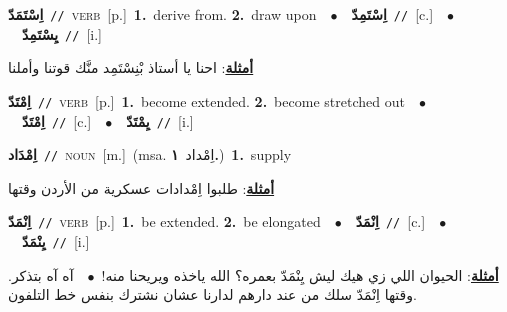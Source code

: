 \documentclass[10pt,a4paper,twoside]{article} %
\begin{document}
\begin{multicols}{2}
{\setlength\topsep{0pt}\textbf{\foreignlanguage{arabic}{اِسْتَمَدّ}}\ {\color{gray}\texttt{//}\color{black}}\ \textsc{verb}\ [p.]\ \textbf{1.}~derive from.  \textbf{2.}~draw upon\ \ $\bullet$\ \ \setlength\topsep{0pt}\textbf{\foreignlanguage{arabic}{اِسْتَمِدّ}}\ {\color{gray}\texttt{//}\color{black}}\ [c.]\ \ $\bullet$\ \ \setlength\topsep{0pt}\textbf{\foreignlanguage{arabic}{يِسْتَمِدّ}}\ {\color{gray}\texttt{//}\color{black}}\ [i.]\  \begin{flushright}\color{gray}\foreignlanguage{arabic}{\textbf{\underline{\foreignlanguage{arabic}{أمثلة}}}: احنا يا أستاذ بْنِسْتَمِد منَّك قوتنا وأملنا}\end{flushright}\color{black}} \vspace{2mm}

{\setlength\topsep{0pt}\textbf{\foreignlanguage{arabic}{اِمْتَدّ}}\ {\color{gray}\texttt{//}\color{black}}\ \textsc{verb}\ [p.]\ \textbf{1.}~become extended.  \textbf{2.}~become stretched out\ \ $\bullet$\ \ \setlength\topsep{0pt}\textbf{\foreignlanguage{arabic}{اِمْتَدّ}}\ {\color{gray}\texttt{//}\color{black}}\ [c.]\ \ $\bullet$\ \ \setlength\topsep{0pt}\textbf{\foreignlanguage{arabic}{يِمْتَدّ}}\ {\color{gray}\texttt{//}\color{black}}\ [i.]\ } \vspace{2mm}

{\setlength\topsep{0pt}\textbf{\foreignlanguage{arabic}{اِمْدَاد}}\ {\color{gray}\texttt{//}\color{black}}\ \textsc{noun}\ [m.]\ \color{gray}(msa. \foreignlanguage{arabic}{اِمْداد}~\foreignlanguage{arabic}{\textbf{١.}})\color{black}\ \textbf{1.}~supply\  \begin{flushright}\color{gray}\foreignlanguage{arabic}{\textbf{\underline{\foreignlanguage{arabic}{أمثلة}}}: طلبوا اِمْدادات عسكرية من الأردن وقتها}\end{flushright}\color{black}} \vspace{2mm}

{\setlength\topsep{0pt}\textbf{\foreignlanguage{arabic}{اِنْمَدّ}}\ {\color{gray}\texttt{//}\color{black}}\ \textsc{verb}\ [p.]\ \textbf{1.}~be extended.  \textbf{2.}~be elongated\ \ $\bullet$\ \ \setlength\topsep{0pt}\textbf{\foreignlanguage{arabic}{اِنْمَدّ}}\ {\color{gray}\texttt{//}\color{black}}\ [c.]\ \ $\bullet$\ \ \setlength\topsep{0pt}\textbf{\foreignlanguage{arabic}{يِنْمَدّ}}\ {\color{gray}\texttt{//}\color{black}}\ [i.]\  \begin{flushright}\color{gray}\foreignlanguage{arabic}{\textbf{\underline{\foreignlanguage{arabic}{أمثلة}}}: الحيوان اللي زي هيك ليش يِنْمَدّ بعمره؟ الله ياخذه ويريحنا منه!\ $\bullet$\ \  آه آه بتذكر. وقتها اِنْمَدّ سلك من عند دارهم لدارنا عشان نشترك بنفس خط التلفون.}\end{flushright}\color{black}} \vspace{2mm}


\end{multicols}
\end{document}
